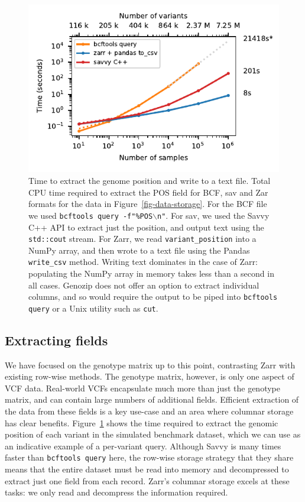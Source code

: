 \documentclass[a4paper,num-refs]{oup-contemporary}
\begin{document}
\begin{figure}
\includegraphics{figures/column-extract}
\caption{Time to extract the genome position and write to a text file.
Total CPU time required to extract the POS field for BCF,
sav and Zar formats
for the data in Figure~\ref{fig-data-storage}.
For the BCF file we used \texttt{bcftools query -f"\%POS$\backslash$n"}.
For sav, we used the Savvy C++ API to extract just the position, 
and output text using the \texttt{std::cout} stream. For Zarr, we read 
\texttt{variant\_position} into a NumPy array, and then wrote to
a text file using the Pandas
\texttt{write\_csv} method. Writing
text dominates in the case of Zarr: populating the NumPy array 
in memory takes less than a second in all cases. Genozip does
not offer an option to extract individual columns, and so would require
the output to be piped into \texttt{bcftools query} or a
Unix utility such as \texttt{cut}.
\label{fig-column-extract}}
\end{figure}

\subsection{Extracting fields}
We have focused on the genotype matrix up to this point, contrasting
Zarr with existing row-wise methods. The genotype matrix, however,
is only one aspect of VCF data.
Real-world VCFs encapsulate much more than just the genotype
matrix, and can contain large numbers of additional fields. Efficient
extraction of the data from these fields is a key use-case
and an area where columnar storage has clear benefits.
Figure~\ref{fig-column-extract} shows the time required to extract 
the genomic position of each variant in the simulated benchmark 
dataset, which we can use as an indicative example of a per-variant 
query. Although Savvy is many times faster than \texttt{bcftools query}
here, the row-wise storage strategy that they share means that 
the entire dataset must be read into memory and 
decompressed to extract just one field from each record. Zarr's
columnar storage excels at these tasks: we only read and decompress
the information required.
\end{document}
